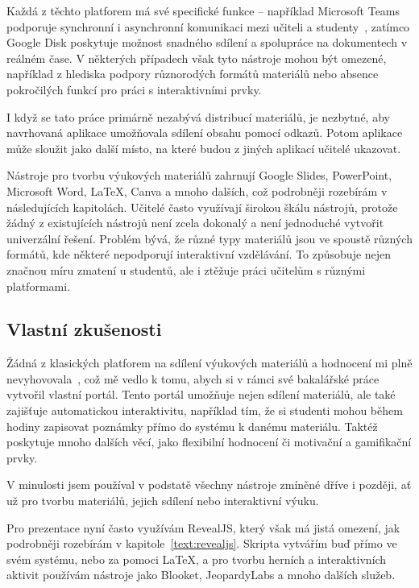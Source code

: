 Každá z těchto platforem má své specifické funkce -- například Microsoft Teams podporuje synchronní i asynchronní komunikaci mezi učiteli a studenty~\cite{teams}, zatímco Google Disk poskytuje možnost snadného sdílení a spolupráce na dokumentech v reálném čase.
V některých případech však tyto nástroje mohou být omezené, například z hlediska podpory různorodých formátů materiálů nebo absence pokročilých funkcí pro práci s interaktivními prvky.

I když se tato práce primárně nezabývá distribucí materiálů, je nezbytné, aby navrhovaná aplikace umožňovala sdílení obsahu pomocí odkazů.
Potom aplikace může sloužit jako další místo, na které budou z jiných aplikací učitelé ukazovat.

Nástroje pro tvorbu výukových materiálů zahrnují Google Slides, PowerPoint, Microsoft Word, \LaTeX, Canva a mnoho dalších, což podrobněji rozebírám v následujících kapitolách.
Učitelé často využívají širokou škálu nástrojů, protože žádný z existujících nástrojů není zcela dokonalý a není jednoduché vytvořit univerzální řešení.
Problém bývá, že různé typy materiálů jsou ve spoustě různých formátů, kde některé nepodporují interaktivní vzdělávání.
To způsobuje nejen značnou míru zmatení u studentů, ale i ztěžuje práci učitelům s různými platformami.

\subsection{Vlastní zkušenosti}

Žádná z klasických platforem na sdílení výukových materiálů a hodnocení mi plně nevyhovovala~\cite{cajthaml_bp}, což mě vedlo k tomu, abych si v rámci své bakalářské práce vytvořil vlastní portál.
Tento portál umožňuje nejen sdílení materiálů, ale také zajišťuje automatickou interaktivitu, například tím, že si studenti mohou během hodiny zapisovat poznámky přímo do systému k danému materiálu.
Taktéž poskytuje mnoho dalších věcí, jako flexibilní hodnocení či motivační a gamifikační prvky.

V minulosti jsem používal v podstatě všechny nástroje zmíněné dříve i později, ať už pro tvorbu materiálů, jejich sdílení nebo interaktivní výuku.

Pro prezentace nyní často využívám RevealJS, který však má jistá omezení, jak podrobněji rozebírám v kapitole~\ref{text:revealjs}.
Skripta vytvářím buď přímo ve svém systému, nebo za pomoci \LaTeX, a pro tvorbu herních a interaktivních aktivit používám nástroje jako Blooket, JeopardyLabs a mnoho dalších služeb.

